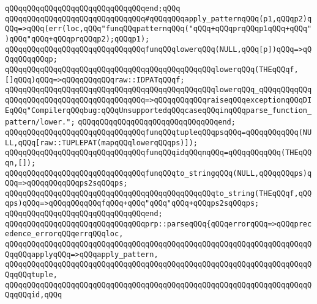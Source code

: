 \verb|qQQqqQQqqQQqqQQqqQQqqQQqqQQqqQQqend;qQQq|\newline
\newline
\verb|qQQqqQQqqQQqqQQqqQQqqQQqqQQqqQQq#qQQqqQQqapply_patternqQQq(p1,qQQqp2)qQQq=>qQQq(err(loc,qQQq"funqQQqpatternqQQq("qQQq+qQQqprqQQqp1qQQq+qQQq")qQQq"qQQq+qQQqprqQQqp2);qQQqp1);|\newline
\newline
\verb|qQQqqQQqqQQqqQQqqQQqqQQqqQQqqQQqfunqQQqlowerqQQq(NULL,qQQq[p])qQQq=>qQQqqQQqqQQqp;|\newline
\verb|qQQqqQQqqQQqqQQqqQQqqQQqqQQqqQQqqQQqqQQqqQQqqQQqlowerqQQq(THEqQQqf,[]qQQq)qQQq=>qQQqqQQqqQQqraw::IDPATqQQqf;|\newline
\verb|qQQqqQQqqQQqqQQqqQQqqQQqqQQqqQQqqQQqqQQqqQQqqQQqlowerqQQq_qQQqqQQqqQQqqQQqqQQqqQQqqQQqqQQqqQQqqQQqqQQq=>qQQqqQQqqQQqraiseqQQqexceptionqQQqDIEqQQq"CompilerqQQqbug:qQQqUnsupportedqQQqcaseqQQqinqQQqparse_function_pattern/lower.";|\newline
\verb|qQQqqQQqqQQqqQQqqQQqqQQqqQQqqQQqend;|\newline
\newline
\verb|qQQqqQQqqQQqqQQqqQQqqQQqqQQqqQQqfunqQQqtupleqQQqpsqQQq=qQQqqQQqqQQq(NULL,qQQq[raw::TUPLEPAT(mapqQQqlowerqQQqps)]);|\newline
\newline
\verb|qQQqqQQqqQQqqQQqqQQqqQQqqQQqqQQqfunqQQqidqQQqnqQQq=qQQqqQQqqQQq(THEqQQqn,[]);|\newline
\newline
\verb|qQQqqQQqqQQqqQQqqQQqqQQqqQQqqQQqfunqQQqto_stringqQQq(NULL,qQQqqQQqps)qQQq=>qQQqqQQqqQQqps2sqQQqps;|\newline
\verb|qQQqqQQqqQQqqQQqqQQqqQQqqQQqqQQqqQQqqQQqqQQqqQQqto_string(THEqQQqf,qQQqps)qQQq=>qQQqqQQqqQQqfqQQq+qQQq"qQQq"qQQq+qQQqps2sqQQqps;|\newline
\verb|qQQqqQQqqQQqqQQqqQQqqQQqqQQqqQQqend;|\newline
\newline
\verb|qQQqqQQqqQQqqQQqqQQqqQQqqQQqqQQqprp::parseqQQq{qQQqerrorqQQq=>qQQqprecedence_errorqQQqerrqQQqloc,|\newline
\verb|qQQqqQQqqQQqqQQqqQQqqQQqqQQqqQQqqQQqqQQqqQQqqQQqqQQqqQQqqQQqqQQqqQQqqQQqqQQqapplyqQQq=>qQQqapply_pattern,|\newline
\verb|qQQqqQQqqQQqqQQqqQQqqQQqqQQqqQQqqQQqqQQqqQQqqQQqqQQqqQQqqQQqqQQqqQQqqQQqqQQqtuple,|\newline
\verb|qQQqqQQqqQQqqQQqqQQqqQQqqQQqqQQqqQQqqQQqqQQqqQQqqQQqqQQqqQQqqQQqqQQqqQQqqQQqid,qQQq|\newline
